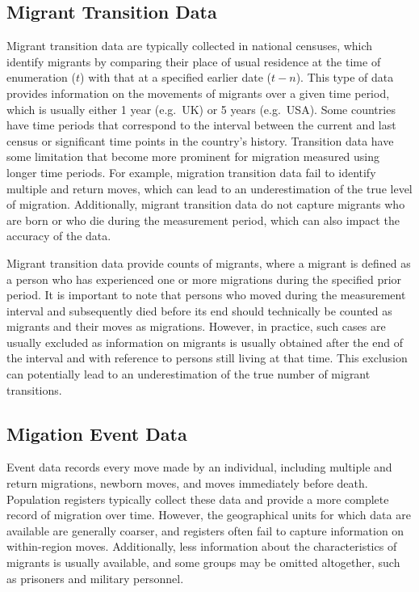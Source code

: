 \documentclass[
]{book}
\begin{document}
\hypertarget{migrant-transition-data}{%
\subsection{Migrant Transition Data}\label{migrant-transition-data}}

Migrant transition data are typically collected in national censuses, which identify migrants by comparing their place of usual residence at the time of enumeration (\(t\)) with that at a specified earlier date (\(t-n\)). This type of data provides information on the movements of migrants over a given time period, which is usually either 1 year (e.g.~UK) or 5 years (e.g.~USA). Some countries have time periods that correspond to the interval between the current and last census or significant time points in the country's history. Transition data have some limitation that become more prominent for migration measured using longer time periods. For example, migration transition data fail to identify multiple and return moves, which can lead to an underestimation of the true level of migration. Additionally, migrant transition data do not capture migrants who are born or who die during the measurement period, which can also impact the accuracy of the data.

Migrant transition data provide counts of migrants, where a migrant is defined as a person who has experienced one or more migrations during the specified prior period. It is important to note that persons who moved during the measurement interval and subsequently died before its end should technically be counted as migrants and their moves as migrations. However, in practice, such cases are usually excluded as information on migrants is usually obtained after the end of the interval and with reference to persons still living at that time. This exclusion can potentially lead to an underestimation of the true number of migrant transitions.

\hypertarget{migation-event-data}{%
\subsection{Migation Event Data}\label{migation-event-data}}

Event data records every move made by an individual, including multiple and return migrations, newborn moves, and moves immediately before death. Population registers typically collect these data and provide a more complete record of migration over time. However, the geographical units for which data are available are generally coarser, and registers often fail to capture information on within-region moves. Additionally, less information about the characteristics of migrants is usually available, and some groups may be omitted altogether, such as prisoners and military personnel.
\end{document}
